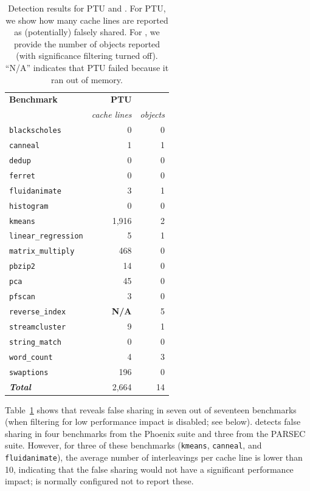 \begin{table}[!t]
\centering
\begin{tabular}{l|r|r}
\hline
{\bf \small Benchmark} & {\bf \small PTU} & {\bf \small \sheriffdetect{}} \\
 & {\em cache lines} & {\em objects}\\
\hline
\small \texttt{blackscholes} & 0 & 0 \\
\small \texttt{canneal} & 1 & 1 \\
\small \texttt{dedup} & 0 & 0 \\
\small \texttt{ferret} & 0 & 0\\
\small \texttt{fluidanimate} & 3 & 1 \\
\small \texttt{histogram} & 0 & 0 \\
\small \texttt{kmeans} & 1,916 & 2 \\
\small \texttt{linear\_regression} & 5 & 1 \\
\small \texttt{matrix\_multiply} & 468 & 0\\
\small \texttt{pbzip2} & 14 & 0 \\
\small \texttt{pca} & 45 & 0 \\
\small \texttt{pfscan} & 3 & 0 \\
\small \texttt{reverse\_index} & \textbf{N/A} & 5 \\
\small \texttt{streamcluster} & 9 & 1\\
\small \texttt{string\_match} & 0 & 0 \\
\small \texttt{word\_count} & 4 & 3\\
\small \texttt{swaptions} & 196 & 0\\
\hline
\small \textbf{\em Total} & 2,664 & 14 \\
\hline
\end{tabular}
\caption{Detection results for PTU and \sheriffdetect{}. For PTU, we show 
how many cache lines are reported as (potentially) falsely shared. For \sheriffdetect{},
we provide the number of objects reported (with significance filtering turned off).
``N/A'' indicates that PTU failed because it ran out of memory.
\label{table:detection}}
\end{table}

Table~\ref{table:detection} shows that \sheriffdetect{} reveals false
sharing in seven out of seventeen benchmarks (when filtering for low
performance impact is disabled; see below). \sheriffdetect{} detects
false sharing
in four benchmarks from the Phoenix suite and
three from the PARSEC suite.
However, for three of these benchmarks
(\texttt{kmeans}, \texttt{canneal}, and \texttt{fluidanimate}), the
average number of interleavings per cache line is lower than 10, indicating
that the false sharing would not have a significant performance
impact;
\sheriffdetect{} is normally configured not to report these.

